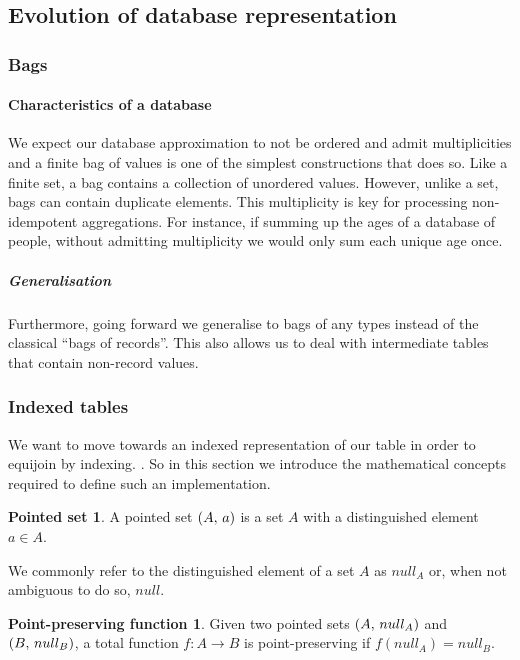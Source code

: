 \subsection{Evolution of database representation}
\subsubsection{Bags}
\paragraph{Characteristics of a database}We expect our database approximation to not be ordered and admit multiplicities and a finite bag of values is one of the simplest constructions that does so. Like a finite set, a bag contains a collection of unordered values. However, unlike a set, bags can contain duplicate elements. \cite{RelationalAlgebraByWayOfAdjunctions} This multiplicity is key for processing non-idempotent aggregations. For instance, if summing up the ages of a database of people, without admitting multiplicity we would only sum each unique age once.
\subparagraph{Generalisation}Furthermore, going forward we generalise to bags of any types instead of the classical ``bags of records''. This also allows us to deal with intermediate tables that contain non-record values.

\subsubsection{Indexed tables}
We want to move towards an indexed representation of our table in order to equijoin by indexing. . So in this section we introduce the mathematical concepts required to define such an implementation.
\theoremstyle{definition}\newtheorem*{psetdef}{Pointed set}
\theoremstyle{definition}\newtheorem*{ppfuncdef}{Point-preserving function}
\theoremstyle{definition}\newtheorem*{mapdef}{Map}
\theoremstyle{definition}\newtheorem*{finitemapdef}{Finite map}
\begin{psetdef}\label{def:pset}
  A pointed set $\left(A,\,a\right)$ is a set $A$ with a distinguished element $a \in A$.
\end{psetdef}
We commonly refer to the distinguished element of a set $A$ as $null_A$ or, when not ambiguous to do so, $null$.
\begin{ppfuncdef}\label{def:ppfunc}
  Given two pointed sets $\left(A,\,null_A\right)$ and $\left(B,\,null_B\right)$, a total function $f: A \rightarrow B$ is point-preserving if $f(null_A) = null_B$.
\end{ppfuncdef}


